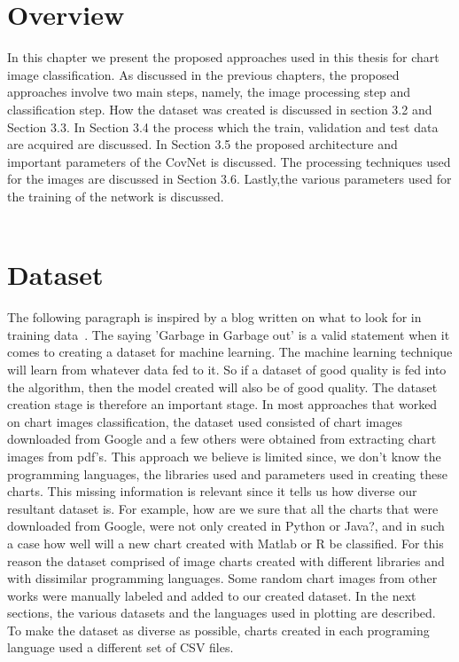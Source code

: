 \documentclass[12pt, a4paper,oneside]{report}
\begin{document}
\section{Overview}
In this chapter we present the proposed approaches used in this thesis for chart image classification. As discussed in the previous chapters, the proposed approaches involve two main steps, namely, the image processing step and classification step. How the dataset was created is discussed in section 3.2 and Section 3.3. In Section 3.4 the process which the train, validation and test data are acquired are discussed. In Section 3.5 the proposed architecture and important parameters of the CovNet is discussed. The processing techniques used for the images are discussed in Section 3.6. Lastly,the various parameters used for the training of the network is discussed.\\\\

\section{Dataset}
The following paragraph is inspired by a blog written on what to look for in training data~\cite{edi}.
The saying 'Garbage in Garbage out' is a valid statement when it comes to creating a dataset for machine learning. The machine learning technique will learn from whatever data fed to it. So if a dataset of good quality is fed into the algorithm, then the model created will also be of good quality. The dataset creation stage is therefore an important stage. In most approaches that worked on chart images classification, the dataset used consisted of chart images downloaded from Google and a few others were obtained from extracting chart images from pdf's. This approach we believe is limited since, we don't know the programming languages, the libraries used and parameters used in creating these charts. This missing information is relevant since it tells us how diverse our resultant dataset is. For example, how are we sure that all the charts that were downloaded from Google, were not only created in Python or Java?, and in such a case how well will a new chart created with Matlab or R be classified. For this reason the dataset comprised of image charts created with different libraries and with dissimilar programming languages. Some random chart images from other works were manually labeled and added to our created dataset. In the next sections, the various datasets and the languages used in plotting are described. To make the dataset as diverse as possible, charts created in each programing language used a different set of CSV files. 
\end{document}
